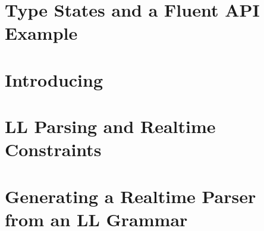 \normalsize

\section{Type States and a Fluent API Example}
\label{section:example}


\section{Introducing \Fajita}
\label{section:fajita}


\section{LL Parsing and Realtime Constraints}
\label{section:intuition}


\section{Generating a Realtime Parser \\ from an LL Grammar}
\label{section:algorithm}

